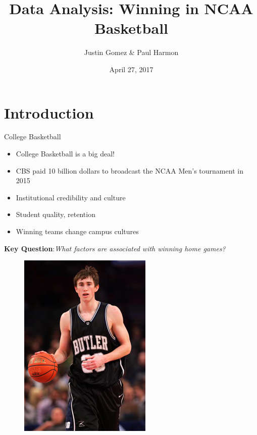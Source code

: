 \documentclass{beamer}
\title[NCAA Basketball]{Data Analysis: Winning in NCAA Basketball}
\author{Justin Gomez \& Paul Harmon}
\date{April 27, 2017}
\begin{document}
	
	\begin{frame}
		\titlepage
	\end{frame}
	

	\section{Introduction}
	
	\begin{frame}{College Basketball}
	\begin{multicols}{2}
		\begin{itemize}
		\item College Basketball is a big deal! 
		\item CBS paid 10 billion dollars to broadcast the NCAA Men's tournament in 2015 
		\item Institutional credibility and culture 
		\item Student quality, retention
		\item Winning teams change campus cultures
				
		
	\end{itemize}
\textbf{Key Question}:\textit{What factors are associated with winning home games? }
	\begin{figure}[r]
		\includegraphics[height = .8\textheight]{hayward.jpg}
	\end{figure}
\end{multicols}
	
	\end{frame}
\end{document}
